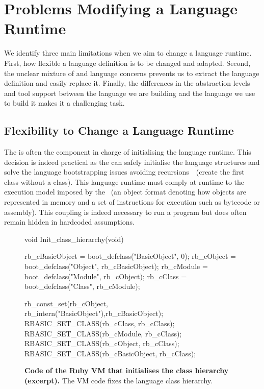 \section{Problems Modifying a Language Runtime} \label{sec:bootstrapping_problems}

We identify three main limitations when we aim to change a language runtime. First, how flexible a language definition is to be changed and adapted. Second, the unclear mixture of \VM and language concerns prevents us to extract the language definition and easily replace it. Finally, the differences in the abstraction levels and tool support between the language we are building and the language we use to build it makes it a challenging task.


\subsection{Flexibility to Change a Language Runtime}

The \VM is often the component in charge of initialising the language runtime. This decision is indeed practical as the \VM can safely initialise the language structures and solve the language bootstrapping issues avoiding recursions~\cite{Kicz91a}~(\eg create the first class without a class). This language runtime must comply at runtime to the execution model imposed by the \VM~(\eg an object format denoting how objects are represented in memory and a set of instructions for execution such as bytecode or assembly). This coupling is indeed necessary to run a program but does often remain hidden in hardcoded assumptions.

\begin{figure}[ht!]
\begin{code}
void Init_class_hierarchy(void) {
    rb_cBasicObject = boot_defclass("BasicObject", 0);
    rb_cObject = boot_defclass("Object", rb_cBasicObject);
    rb_cModule = boot_defclass("Module", rb_cObject);
    rb_cClass =  boot_defclass("Class",  rb_cModule);

    rb_const_set(rb_cObject, rb_intern("BasicObject"),rb_cBasicObject);
    RBASIC_SET_CLASS(rb_cClass, rb_cClass);
    RBASIC_SET_CLASS(rb_cModule, rb_cClass);
    RBASIC_SET_CLASS(rb_cObject, rb_cClass);
    RBASIC_SET_CLASS(rb_cBasicObject, rb_cClass);
}
\end{code}
\caption{\textbf{Code of the Ruby VM that initialises the class hierarchy (excerpt).} The VM code fixes the language class hierarchy.\label{code:ruby_hierarchy}}
\end{figure}

